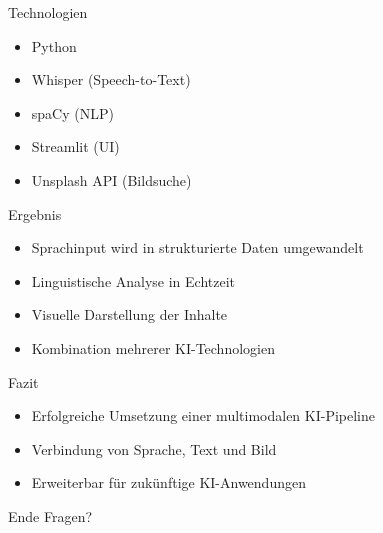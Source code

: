 \documentclass{beamer}
\begin{document}
\begin{frame}{Technologien}
\begin{itemize}
    \item Python
    \item Whisper (Speech-to-Text)
    \item spaCy (NLP)
    \item Streamlit (UI)
    \item Unsplash API (Bildsuche)
\end{itemize}
\end{frame}

\begin{frame}{Ergebnis}
\begin{itemize}
    \item Sprachinput wird in strukturierte Daten umgewandelt
    \item Linguistische Analyse in Echtzeit
    \item Visuelle Darstellung der Inhalte
    \item Kombination mehrerer KI-Technologien
\end{itemize}
\end{frame}

\begin{frame}{Fazit}
\begin{itemize}
    \item Erfolgreiche Umsetzung einer multimodalen KI-Pipeline
    \item Verbindung von Sprache, Text und Bild
    \item Erweiterbar für zukünftige KI-Anwendungen
\end{itemize}
\end{frame}

\begin{frame}{Ende}
\centering
\Huge Fragen?
\end{frame}
\end{document}
